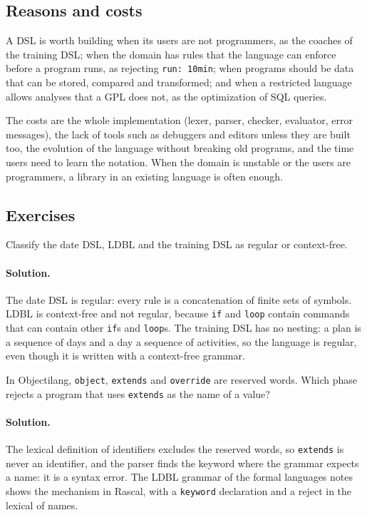 \subsection{Reasons and costs}

A DSL is worth building when its users are not programmers, as the coaches
of the training DSL; when the domain has rules that the language can enforce
before a program runs, as rejecting \texttt{run: 10min}; when programs should
be data that can be stored, compared and transformed; and when a restricted
language allows analyses that a GPL does not, as the optimization of SQL
queries.

The costs are the whole implementation (lexer, parser, checker, evaluator,
error messages), the lack of tools such as debuggers and editors unless they
are built too, the evolution of the language without breaking old programs,
and the time users need to learn the notation. When the domain is unstable or
the users are programmers, a library in an existing language is often enough.

\subsection{Exercises}

\begin{exercise}
Classify the date DSL, LDBL and the training DSL as regular or context-free.
\end{exercise}

\paragraph{Solution.} The date DSL is regular: every rule is a concatenation of
finite sets of symbols. LDBL is context-free and not regular, because
\texttt{if} and \texttt{loop} contain commands that can contain other
\texttt{if}s and \texttt{loop}s. The training DSL has no nesting: a plan is a
sequence of days and a day a sequence of activities, so the language is
regular, even though it is written with a context-free grammar.

\begin{exercise}
In Objectilang, \texttt{object}, \texttt{extends} and \texttt{override} are
reserved words. Which phase rejects a program that uses \texttt{extends} as the
name of a value?
\end{exercise}

\paragraph{Solution.} The lexical definition of identifiers excludes the
reserved words, so \texttt{extends} is never an identifier, and the parser
finds the keyword where the grammar expects a name: it is a syntax error. The
LDBL grammar of the formal languages notes shows the mechanism in Rascal, with
a \texttt{keyword} declaration and a reject in the lexical of names.

